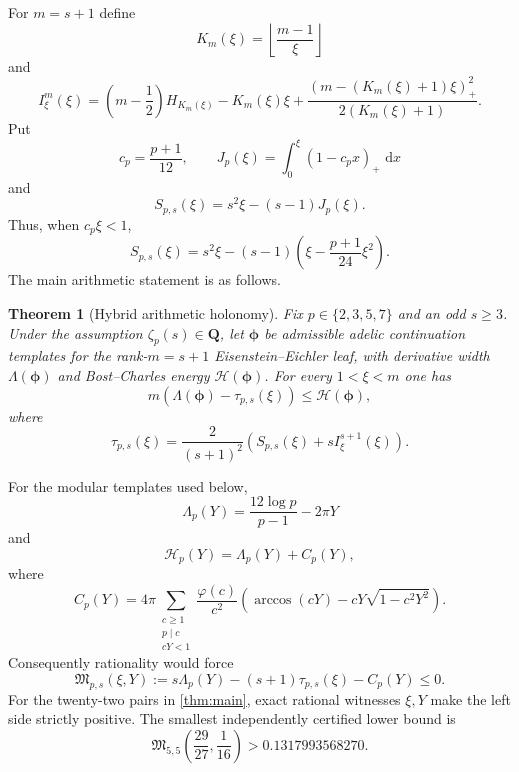 \documentclass[11pt]{article}
\newtheorem{theorem}{Theorem}[section]
\theoremstyle{definition}
\theoremstyle{remark}
\newcommand{\Q}{\mathbf Q}
\newcommand{\dd}{\,\mathrm d}
\newcommand{\Energy}{\mathscr H}
\newcommand{\LambdaAH}{\Lambda}
\newcommand{\floor}[1]{\left\lfloor #1\right\rfloor}
\newcommand{\positivepart}[1]{\left(#1\right)_{+}}
\begin{document}
For $m=s+1$ define
\[
 K_m(\xi)=\floor{\frac{m-1}{\xi}}
\]
and
\begin{equation}\label{eq:I-def-intro}
 I^m_\xi(\xi)=
 \left(m-\frac12\right)H_{K_m(\xi)}-K_m(\xi)\xi
 +\frac{\positivepart{m-(K_m(\xi)+1)\xi}^2}{2(K_m(\xi)+1)}.
\end{equation}
Put
\[
 c_p=\frac{p+1}{12},\qquad
 J_p(\xi)=\int_0^\xi(1-c_px)_+\,\dd x
\]
and
\begin{equation}\label{eq:S-def-intro}
 S_{p,s}(\xi)=s^2\xi-(s-1)J_p(\xi).
\end{equation}
Thus, when $c_p\xi<1$,
\[
 S_{p,s}(\xi)=s^2\xi-(s-1)
 \left(\xi-\frac{p+1}{24}\xi^2\right).
\]
The main arithmetic statement is as follows.

\begin{theorem}[Hybrid arithmetic holonomy]\label{thm:hybrid-holonomy}
Fix $p\in\{2,3,5,7\}$ and an odd $s\ge3$.  Under the assumption
$\zeta_p(s)\in\Q$, let $\boldsymbol\phi$ be admissible adelic continuation
templates for the rank-$m=s+1$ Eisenstein--Eichler leaf, with derivative width
$\LambdaAH(\boldsymbol\phi)$ and Bost--Charles energy
$\Energy(\boldsymbol\phi)$.  For every $1<\xi<m$ one has
\[
 m\left(\LambdaAH(\boldsymbol\phi)-\tau_{p,s}(\xi)\right)
 \le \Energy(\boldsymbol\phi),
\]
where
\begin{equation}\label{eq:tau-main}
 \boxed{
 \tau_{p,s}(\xi)=\frac{2}{(s+1)^2}
 \left(S_{p,s}(\xi)+sI^{s+1}_\xi(\xi)\right).}
\end{equation}
\end{theorem}

For the modular templates used below,
\[
 \Lambda_p(Y)=\frac{12\log p}{p-1}-2\pi Y
\]
and
\[
 \Energy_p(Y)=\Lambda_p(Y)+C_p(Y),
\]
where
\begin{equation}\label{eq:C-intro}
 C_p(Y)=4\pi
 \sum_{\substack{c\ge1\\p\mid c\\cY<1}}
 \frac{\varphi(c)}{c^2}
 \left(\arccos(cY)-cY\sqrt{1-c^2Y^2}\right).
\end{equation}
Consequently rationality would force
\begin{equation}\label{eq:margin-intro}
 \mathfrak M_{p,s}(\xi,Y):=
 s\Lambda_p(Y)-(s+1)\tau_{p,s}(\xi)-C_p(Y)\le0.
\end{equation}
For the twenty-two pairs in \cref{thm:main}, exact rational witnesses
$\xi,Y$ make the left side strictly positive.  The smallest independently
certified lower bound is
\[
 \mathfrak M_{5,5}\left(\frac{29}{27},\frac1{16}\right)
 >0.1317993568270.
\]
\end{document}
